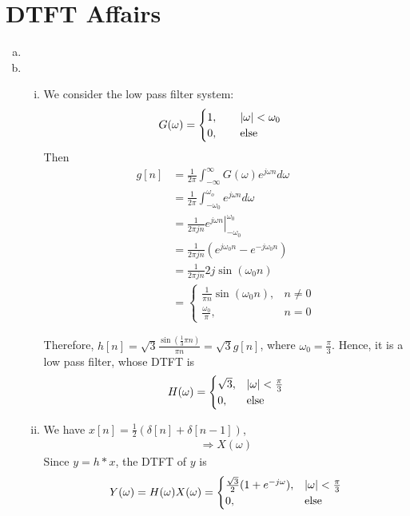 \section{DTFT Affairs}\label{sec:p3}

\begin{enumerate}[(a)]
\item 

\item 
\begin{enumerate}[i.]
	\item We consider the low pass filter system:
	\[G(\omega) = \begin{cases}
	1, \qquad \left\lvert \omega \right\rvert < \omega_0\\
	0, \qquad \text{else}
	\end{cases}\]
	Then
	\begin{align*}
	g[n] 
	&= \frac{1}{2\pi} \int_{-\infty}^{\infty}G(\omega)e^{j \omega n} d\omega \\
	&= \frac{1}{2\pi} \int_{-\omega_0}^{\omega_o} e^{j \omega n} d\omega \\
	&= \frac{1}{2\pi j n} \left. e^{j \omega n}\right|_{-\omega_0}^{\omega_0} \\
	&= \frac{1}{2\pi j n} \left( e^{j \omega_0 n} - e^{-j\omega_0 n} \right) \\
	&= \frac{1}{2\pi j n} 2j\sin(\omega_0 n) \\
	&= \begin{cases}
	\frac{1}{\pi n}\sin(\omega_0 n), & n \neq 0 \\
	\frac{\omega_0}{\pi}, & n = 0
	\end{cases}
	\end{align*}
	
	Therefore, $h[n] = \sqrt{3} \frac{\sin \left( \frac{1}{3} \pi n \right) }{\pi n} = \sqrt{3} g[n]$, where $\omega_0 = \frac{\pi}{3}$. Hence, it is a low pass filter, whose DTFT is
	\[H(\omega) = \begin{cases}
	\sqrt{3}, & \left\lvert \omega \right\rvert < \frac{\pi}{3} \\
	0, & \text{else}
	\end{cases}\]
	
	\item We have $x[n] = \frac{1}{2} (\delta[n] + \delta[n-1])$,
	\begin{align*}
		\Rightarrow X(\omega) 
	\end{align*}
	Since $y = h * x$, the DTFT of $y$ is
	\[ Y(\omega) = H(\omega) X(\omega) = \begin{cases}
	\frac{\sqrt{3}}{2}(1 + e^{-j \omega}), & \left\lvert \omega \right\rvert < \frac{\pi}{3} \\
	0, & \text{else}
	\end{cases}\]
	

\end{enumerate}
\end{enumerate}

